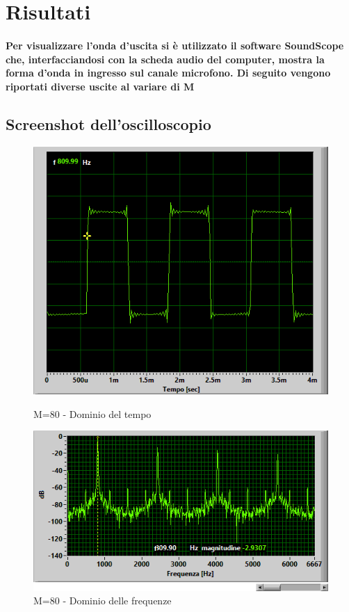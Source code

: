 \documentclass{article}
\begin{document}
\section{Risultati}
\paragraph{Per visualizzare l'onda d'uscita si è utilizzato il software SoundScope che, interfacciandosi con la scheda audio del computer, mostra la forma d'onda in ingresso sul canale microfono. Di seguito vengono riportati diverse uscite al variare di M}
\subsection{Screenshot dell'oscilloscopio}

\begin{figure}[H]
   \begin{minipage}{0.48\textwidth}
     \centering
     \includegraphics[width=1\linewidth]{m80}
     \caption{M=80 - Dominio del tempo}\label{Fig:Data1}
   \end{minipage}\hfill
   \begin{minipage}{0.48\textwidth}
     \centering
     \includegraphics[width=1\linewidth]{m80f}
     \caption{M=80 - Dominio delle frequenze}\label{Fig:Data2}
   \end{minipage}
\end{figure}
\end{document}
